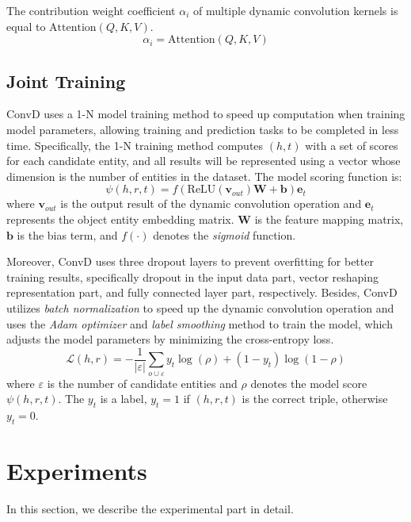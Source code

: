 \documentclass[letterpaper]{article} %
\begin{document}
The contribution weight coefficient $\alpha_{i}$ of multiple dynamic convolution kernels is equal to $\mathrm{Attention}(Q,K,V)$.
\begin{equation}
    \alpha_{i} = \mathrm{Attention}(Q,K,V)
\end{equation}


\subsection{Joint Training}
ConvD uses a 1-N model training method to speed up computation when training model parameters, allowing training and prediction tasks to be completed in less time. Specifically, the 1-N training method computes $(h, t)$ with a set of scores for each candidate entity, and all results will be represented using a vector whose dimension is the number of entities in the dataset. The model scoring function is:
\begin{equation}
    \psi(h,r,t) = f\left( \mathrm{ReLU}\left( \boldsymbol{v}_{out} \right) \boldsymbol{W}+\boldsymbol{b} \right) \boldsymbol{e}_{t}
\end{equation}
where $\boldsymbol{v}_{out}$ is the output result of the dynamic convolution operation and $\boldsymbol{e}_{t}$ represents the object entity embedding matrix. $\boldsymbol{W}$ is the feature mapping matrix, $\boldsymbol{b}$ is the bias term, and $f(\cdot)$ denotes the \textit{sigmoid} function.

Moreover, ConvD uses three dropout layers to prevent overfitting for better training results, specifically dropout in the input data part, vector reshaping representation part, and fully connected layer part, respectively. Besides, ConvD utilizes \textit{batch normalization} to speed up the dynamic convolution operation and uses the \textit{Adam optimizer} and \textit{label smoothing} method to train the model, which adjusts the model parameters by minimizing the cross-entropy loss.
\begin{equation}
\mathcal{L}(h,r)=-\frac {1}{|\varepsilon|}\sum_{o\cup \varepsilon}y_t\log(\rho)+(1-y_t)\log(1-\rho)
\end{equation}
where $\varepsilon$ is the number of candidate entities and $\rho$ denotes the model score $\psi(h,r,t)$. The $y_t$ is a label, $y_t=1$ if $(h,r,t)$ is the correct triple, otherwise $y_t=0$.



\section{Experiments}
In this section, we describe the experimental part in detail.
\end{document}
